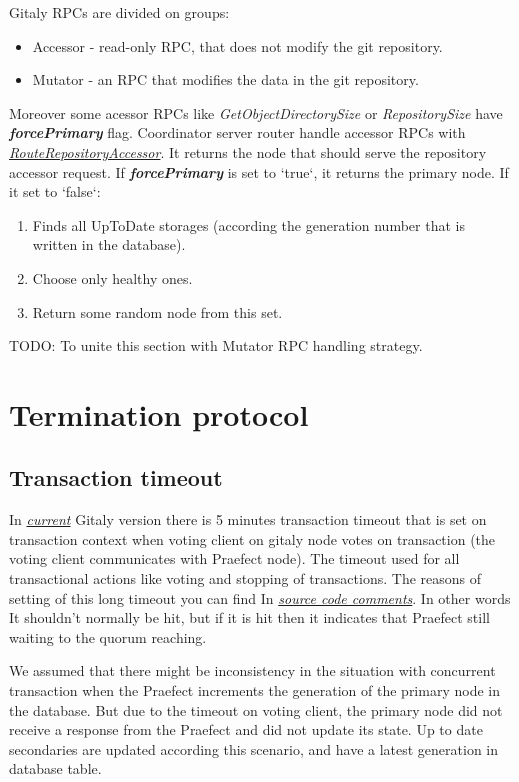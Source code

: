 \documentclass[acmlarge, screen, nonacm]{acmart}
\begin{document}
Gitaly RPCs are divided on groups:
\begin{itemize}
\item Accessor - read-only RPC, that does not modify the git repository.
\item Mutator - an RPC that modifies the data in the git repository.
\end{itemize}

Moreover some acessor RPCs like \textit{GetObjectDirectorySize} or \textit{RepositorySize} have \textbf{\textit{forcePrimary}} flag. 
Coordinator server router handle accessor RPCs with  
\emph{\href{https://gitlab.com/gitlab-org/gitaly/-/blob/master/internal/praefect/coordinator.go\#L356}{ RouteRepositoryAccessor}}. 
It returns the node that should serve the repository accessor request. If \textbf{\textit{forcePrimary }} is set to `true`, it returns the primary node. 
If it set to `false`: 
\begin{enumerate}
\item Finds all UpToDate storages (according the generation number that is written in the database).
\item Choose only healthy ones.
\item Return some random node from this set.
\end{enumerate}

TODO: To unite this section with Mutator RPC handling strategy.

\section{Termination protocol}
\subsection{Transaction timeout}
In \emph{\href{https://gitlab.com/gitlab-org/gitaly/-/tags/v14.0.0-rc1}{ current}} 
Gitaly version there is 5 minutes transaction timeout that is set on transaction 
context when voting client on gitaly node votes on transaction (the voting client 
communicates with Praefect node).
The timeout used for all transactional actions like voting and stopping of transactions.
 The reasons of setting of this long timeout you can find 
In \emph{\href{https://gitlab.com/gitlab-org/gitaly/-/blob/master/internal/gitaly/transaction/manager.go\#L21}{ source code comments}}. 
In other words It shouldn't normally be hit, but if it is hit then it indicates that Praefect still waiting to the quorum reaching. 

We assumed that there might be inconsistency in the situation with concurrent transaction when the Praefect 
increments the generation of the primary node in the database. But due to the timeout on voting client, 
the primary node did not receive a response from the Praefect and did not update its state. 
Up to date secondaries are updated according this scenario, and have a latest generation in database table. 
\end{document}
